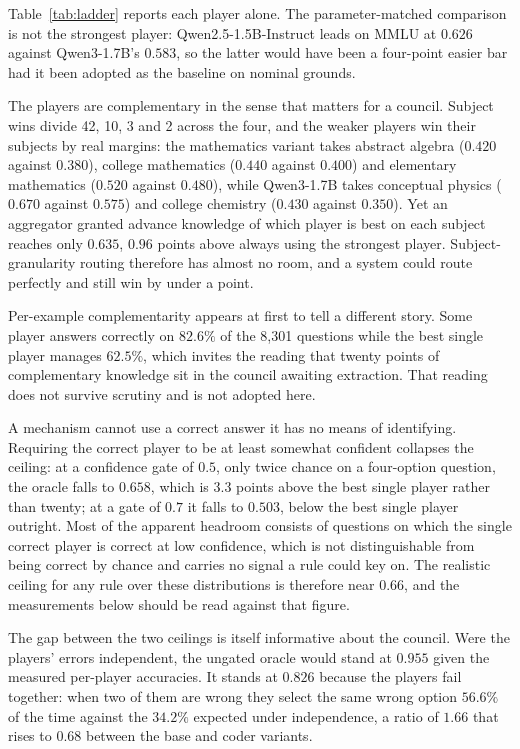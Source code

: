 Table~\ref{tab:ladder} reports each player alone. The parameter-matched
comparison is not the strongest player: Qwen2.5-1.5B-Instruct leads on MMLU at
$0.626$ against Qwen3-1.7B's $0.583$, so the latter would have been a four-point
easier bar had it been adopted as the baseline on nominal grounds.

The players are complementary in the sense that matters for a council. Subject
wins divide 42, 10, 3 and 2 across the four, and the weaker players win their
subjects by real margins: the mathematics variant takes abstract algebra
($0.420$ against $0.380$), college mathematics ($0.440$ against $0.400$) and
elementary mathematics ($0.520$ against $0.480$), while Qwen3-1.7B takes
conceptual physics ($0.670$ against $0.575$) and college chemistry ($0.430$
against $0.350$). Yet an aggregator granted advance knowledge of which player is
best on each subject reaches only $0.635$, $0.96$ points above always using the
strongest player. Subject-granularity routing therefore has almost no room, and a
system could route perfectly and still win by under a point.

Per-example complementarity appears at first to tell a different story. Some
player answers correctly on $82.6\%$ of the 8{,}301 questions while the best
single player manages $62.5\%$, which invites the reading that twenty points of
complementary knowledge sit in the council awaiting extraction. That reading does
not survive scrutiny and is not adopted here.

A mechanism cannot use a correct answer it has no means of identifying.
Requiring the correct player to be at least somewhat confident collapses the
ceiling: at a confidence gate of $0.5$, only twice chance on a four-option
question, the oracle falls to $0.658$, which is $3.3$ points above the best
single player rather than twenty; at a gate of $0.7$ it falls to $0.503$, below
the best single player outright. Most of the apparent headroom consists of
questions on which the single correct player is correct at low confidence, which
is not distinguishable from being correct by chance and carries no signal a rule
could key on. The realistic ceiling for any rule over these distributions is
therefore near $0.66$, and the measurements below should be read against that
figure.

The gap between the two ceilings is itself informative about the council. Were
the players' errors independent, the ungated oracle would stand at $0.955$ given
the measured per-player accuracies. It stands at $0.826$ because the players fail
together: when two of them are wrong they select the same wrong option $56.6\%$
of the time against the $34.2\%$ expected under independence, a ratio of $1.66$
that rises to $0.68$ between the base and coder variants.

